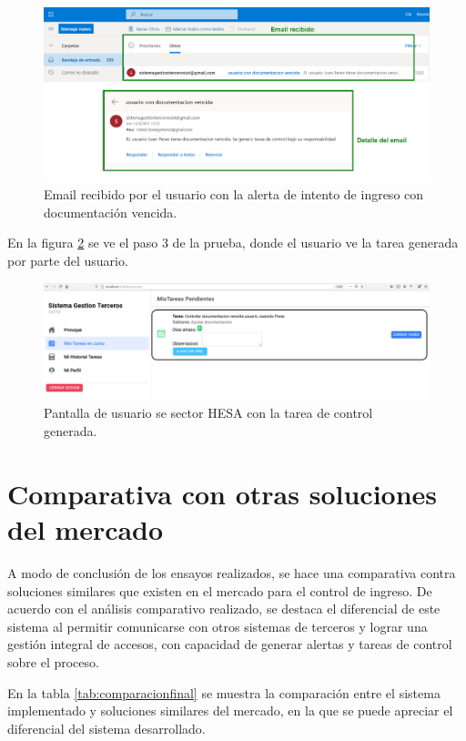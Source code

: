 \begin{figure}[ht]
	\centering
	\includegraphics[width=1\textwidth]{./Figures/email.png}
	\caption{Email recibido por el usuario con la alerta de intento de ingreso con documentación vencida.}
	\label{fig:Email}
\end{figure}

En la figura \ref{fig:Tarea} se ve el paso 3 de la prueba, donde el usuario ve la tarea generada por parte del usuario.

\begin{figure}[ht]
	\centering
	\includegraphics[width=1\textwidth]{./Figures/tarea.png}
	\caption{Pantalla de usuario se sector HESA con la tarea de control generada.}
	\label{fig:Tarea}
\end{figure}

\clearpage
\section{Comparativa con otras soluciones del mercado}

A modo de conclusión de los ensayos realizados, se hace una comparativa contra soluciones similares que existen en el mercado para el control de ingreso. De acuerdo con el análisis comparativo realizado, se destaca el diferencial de este sistema al permitir comunicarse con otros sistemas de terceros y lograr una gestión integral de accesos, con capacidad de generar alertas y tareas de control sobre el proceso.

En la tabla \ref{tab:comparacionfinal} se muestra la comparación entre el sistema implementado y soluciones similares del mercado, en la que se puede apreciar el diferencial del sistema desarrollado.


